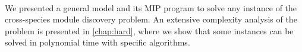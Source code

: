 \paragraph{}
We presented a general model and its MIP program to solve any instance of the cross-species module discovery problem.
An extensive complexity analysis of the problem is presented in \cref{chap:hard}, where we show that some instances can be solved in polynomial time with specific algorithms.
